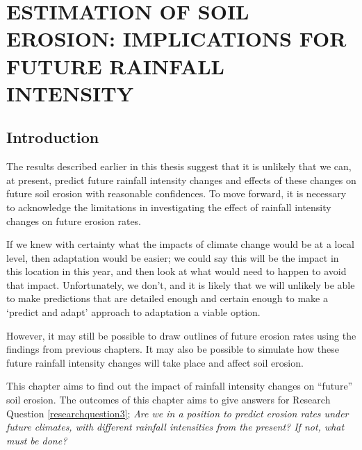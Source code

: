 \chapter{ESTIMATION OF SOIL EROSION: IMPLICATIONS FOR FUTURE RAINFALL
INTENSITY}
\label{sec:ESTIMATIONSOFFUTURESOILEROSION}

\section{Introduction}
\label{sec:FutureSoilErosionIntroduction}

The results described earlier in this thesis suggest that it is unlikely that
we can, at present, predict future rainfall intensity changes and effects of
these changes on future soil erosion with reasonable confidences. To move
forward, it is necessary to acknowledge the limitations in investigating the
effect of rainfall intensity changes on future erosion rates.

If we knew with certainty what the impacts of climate change would be at a local
level, then adaptation would be easier; we could say this will be the impact in
this location in this year, and then look at what would need to happen to avoid
that impact. Unfortunately, we don't, and it is likely that we will unlikely be
able to make predictions that are detailed enough and certain enough to make a
`predict and adapt' approach to adaptation a viable option.

However, it may still be possible to draw outlines of future erosion rates using
the findings from previous chapters. It may also be possible to simulate how
these future rainfall intensity changes will take place and affect soil
erosion.

This chapter aims to find out the impact of rainfall intensity changes on
``future'' soil erosion. The outcomes of this chapter aims to give answers for
Research Question \ref{researchquestion3}; \textit{Are we in a position to
predict erosion rates under future climates, with different rainfall intensities
from the present? If not, what must be done?}


